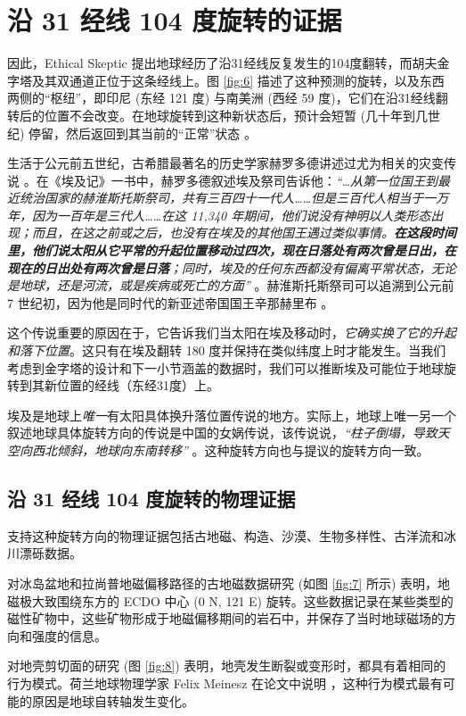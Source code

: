 \documentclass[10pt,twocolumn,letterpaper]{article}
\begin{document}
\section{沿 31 经线 104 度旋转的证据}

因此，Ethical Skeptic 提出地球经历了沿31经线反复发生的104度翻转，而胡夫金字塔及其双通道正位于这条经线上。图 \ref{fig:6} 描述了这种预测的旋转，以及东西两侧的“枢纽”，即印尼 (东经 121 度) 与南美洲 (西经 59 度)，它们在沿31经线翻转后的位置不会改变。在地球旋转到这种新状态后，预计会短暂 (几十年到几世纪) 停留，然后返回到其当前的“正常”状态 \cite{150}。

生活于公元前五世纪，古希腊最著名的历史学家赫罗多德讲述过尤为相关的灾变传说 \cite{31}。在《埃及记》一书中，赫罗多德叙述埃及祭司告诉他：\textit{“…从第一位国王到最近统治国家的赫淮斯托斯祭司，共有三百四十一代人……但是三百代人相当于一万年，因为一百年是三代人……在这 11,340 年期间，他们说没有神明以人类形态出现；而且，在这之前或之后，也没有在埃及的其他国王遇过类似事情。\textbf{在这段时间里，他们说太阳从它平常的升起位置移动过四次，现在日落处有两次曾是日出，在现在的日出处有两次曾是日落}；同时，埃及的任何东西都没有偏离平常状态，无论是地球，还是河流，或是疾病或死亡的方面”} \cite{32}。赫淮斯托斯祭司可以追溯到公元前 7 世纪初，因为他是同时代的新亚述帝国国王辛那赫里布 \cite{32,33,34}。

这个传说重要的原因在于，它告诉我们当太阳在埃及移动时，\textit{它确实换了它的升起和落下位置}。这只有在埃及翻转 180 度并保持在类似纬度上时才能发生。当我们考虑到金字塔的设计和下一小节涵盖的数据时，我们可以推断埃及可能位于地球旋转到其新位置的经线（东经31度）上。

埃及是地球上\textit{唯一}有太阳具体换升落位置传说的地方。实际上，地球上唯一另一个叙述地球具体旋转方向的传说是中国的女娲传说，该传说说，\textit{“柱子倒塌，导致天空向西北倾斜，地球向东南转移”} \cite{8}。这种旋转方向也与提议的旋转方向一致。

\subsection{沿 31 经线 104 度旋转的物理证据}

支持这种旋转方向的物理证据包括古地磁、构造、沙漠、生物多样性、古洋流和冰川漂砾数据。

对冰岛盆地和拉尚普地磁偏移路径的古地磁数据研究 \cite{35} (如图 \ref{fig:7} 所示) 表明，地磁极大致围绕东方的 ECDO 中心 (0 N, 121 E) 旋转。这些数据记录在某些类型的磁性矿物中，这些矿物形成于地磁偏移期间的岩石中，并保存了当时地球磁场的方向和强度的信息。

对地壳剪切面的研究 (图 \ref{fig:8}) 表明，地壳发生断裂或变形时，都具有着相同的行为模式。荷兰地球物理学家 Felix Meinesz 在论文中说明 \cite{36}，这种行为模式最有可能的原因是地球自转轴发生变化。
\end{document}
